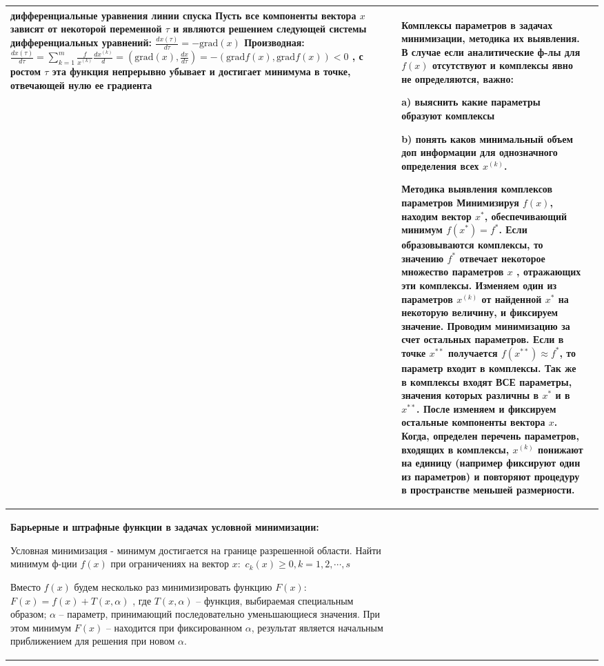 \documentclass[a4paper,2pt]{article}
\begin{document}
\begin{tabular}{|p{}|p{}|p{}|}
\textbf{дифференциальные уравнения линии спуска}
Пусть все компоненты вектора \(x\) зависят от некоторой переменной \(\tau\) и являются решением следующей системы дифференциальных уравнений: \(\frac{dx(\tau)}{d\tau} = -\text{grad}(x)\)
Производная: \(\frac{dx(\tau)}{d\tau} = \sum_{k=1}^{m}\frac{f}{x^{(k)}}\frac{dx^{(k)}}{d} = (\text{grad}(x), \frac{dx}{d\tau}) = -(\text{grad}f(x), \text{grad}f(x)) < 0\) , с ростом \(\tau\) эта функция непрерывно убывает и достигает минимума в точке, отвечающей нулю ее градиента
&

\textbf{Комплексы параметров в задачах минимизации, методика их выявления.}
В случае если аналитические ф-лы для \(f(x)\) отсутствуют и комплексы явно не определяются, важно:

a) выяснить какие параметры образуют комплексы

b) понять каков минимальный объем доп информации для однозначного определения всех \(x^{(k)}\).

\textbf{Методика выявления комплексов параметров}
Минимизируя \(f(x)\), находим вектор \(x^{*}\), обеспечивающий минимум \(f(x^{*}) = f^{*}\). Если образовываются комплексы, то значению \(f^{*}\) отвечает некоторое множество параметров \(x\) , отражающих эти комплексы. Изменяем один из параметров \(x^{(k)}\) от найденной \(x^{*}\) на
некоторую величину, и фиксируем значение. Проводим минимизацию за счет остальных параметров. Если в точке \(x^{**}\) получается \(f(x^{**}) \approx f^{*}\), то параметр входит в комплексы. Так же в комплексы входят ВСЕ параметры, значения которых различны в \(x^{*}\) и в \(x^{**}\).
После изменяем и фиксируем остальные компоненты вектора \(x\). Когда, определен перечень параметров, входящих в комплексы, \(x^{(k)}\) понижают на единицу (например фиксируют один из параметров) и повторяют процедуру в пространстве меньшей размерности.


\\\hline

\textbf{Барьерные и штрафные функции в задачах условной минимизации:}

Условная минимизация - минимум достигается на границе разрешенной области.
Найти минимум ф-ции \(f(x)\) при ограничениях на вектор $x:$  \(c_k(x) \geq 0, k=1, 2,\cdots , s \tag{17} \)

Вместо \(f(x)\) будем несколько раз минимизировать функцию $F(x):$ \(F(x)=f(x)+T(x, \alpha)  \tag{18} \) , где \(T(x, \alpha)\) – функция, выбираемая специальным образом; \(\alpha\) – параметр, принимающий последовательно уменьшающиеся значения. При этом минимум \(F(x)\) – находится при фиксированном \(\alpha\), результат является начальным приближением для решения при новом \(\alpha\).


\end{tabular}
\end{document}
